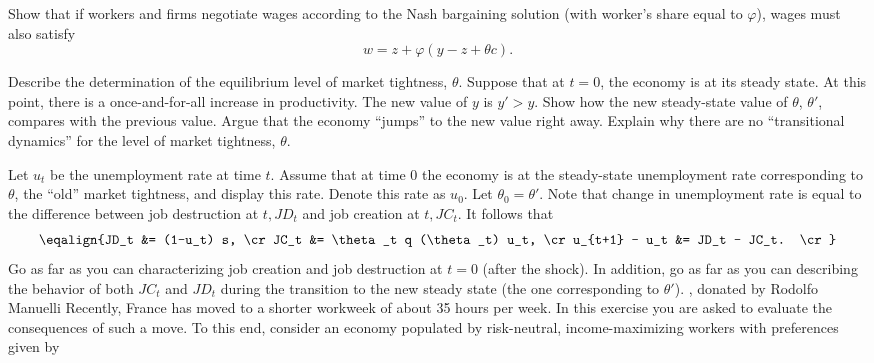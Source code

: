  Show that if workers and firms negotiate wages according to
the Nash bargaining solution (with worker's share equal to $\varphi$),
wages must also satisfy
$$ w = z + \varphi (y - z + \theta c). $$

  Describe the determination of the equilibrium level
 of market tightness, $\theta$.
\medskip
{}  Suppose that at $t = 0$, the economy is at its steady
state.  At this point, there is a once-and-for-all
increase in productivity.  The new value of $y$ is $y' > y$.
Show how the new steady-state value of $\theta$, $\theta'$, compares
with the previous value.  Argue that the economy ``jumps'' to the new
value right away.  Explain why there are no ``transitional dynamics'' for
the level of market tightness, $\theta$.
\medskip

  Let $u_t$ be the unemployment rate at time $t$.
  Assume that at time $0$ the economy is at the steady-state
 unemployment rate corresponding to $\theta$, the ``old''
market tightness, and display this rate.  Denote this rate as $u_0$.
  Let $\theta_0 = \theta'$.  Note that change in unemployment rate is
equal to the difference between job destruction at $t, JD_t$ and
job creation at $t, JC_t$.  It follows that
$$ \eqalign{JD_t &= (1-u_t) s,  \cr
    JC_t &= \theta_t q (\theta_t) u_t,  \cr
    u_{t+1} - u_t &= JD_t - JC_t.  \cr }  $$
    Go as far as you can characterizing job creation and job
destruction at $t = 0$ (after the shock).  In addition, go as far
as you can describing the behavior of both $JC_t$ and $JD_t$ during
the transition to the new steady state (the one corresponding to $\theta'$).
\vfil\eject
\medskip
{} , donated by
Rodolfo Manuelli
\medskip \noindent
Recently, France has moved to a shorter workweek of about 35 hours per week.   In this
exercise you are asked to evaluate the consequences of such a move.
To this end, consider an economy populated by risk-neutral, income-maximizing  workers with preferences given by


